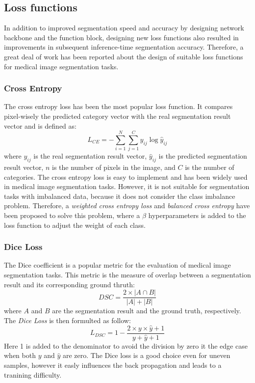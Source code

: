 \subsection{Loss functions}
In addition to improved segmentation speed and accuracy
by designing network backbone and the function block, designing new loss functions also resulted in improvements in subsequent inference-time segmentation accuracy. Therefore,
a great deal of work has been reported about the design of
suitable loss functions for medical image segmentation tasks.

\subsubsection{Cross Entropy}
The cross entropy loss has been the most popular loss function. It compares pixel-wisely the predicted category vector with the real segmentation result vector and is defined as:
$$
L_{CE} = -\sum_{i=1}^{N} \sum_{j=1}^{C} y_{ij} \log \hat{y}_{ij}
$$
where $y_{ij}$ is the real segmentation result vector, $\hat{y}_{ij}$ is the
predicted segmentation result vector, $n$ is the number of pixels in the image,
and $C$ is the number of categories. The cross entropy loss is easy to
implement and has been widely used in medical image segmentation tasks. However,
it is not suitable for segmentation tasks with imbalanced data, because it does
not consider the class imbalance problem. Therefore, a \emph{weighted cross
entropy loss} and \emph{balanced cross entropy} have been proposed to solve this
problem, where a $\beta$ hyperparameters is added to the loss function to adjust
the weight of each class.

\subsubsection{Dice Loss}
The Dice coefficient is a popular metric for the evaluation of medical image segmentation tasks. This metric is the measure of overlap between a segmentation result and its corresponding ground thruth:
$$
DSC = \frac{2 \times |A \cap B|}{|A| + |B|}
$$
where $A$ and $B$ are the segmentation result and the ground truth, respectively. The \emph{Dice Loss} is then formulted as follow:
$$
L_{DSC} = 1 - \frac{2 \times y \times \hat{y} + 1}{y + \hat{y} + 1}
$$
Here 1 is added to the denominator to avoid the division by zero it the edge case when both $y$ and $\hat{y}$ are zero. The Dice loss is a good choice even for uneven samples, however it easly influences the back propagation and leads to a tranining difficulty.

